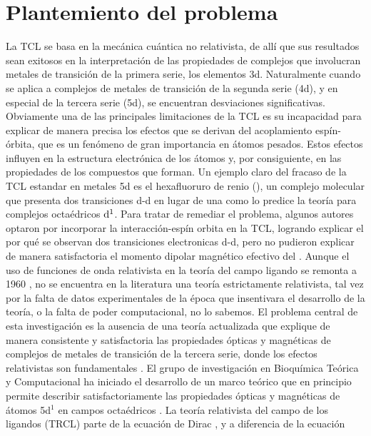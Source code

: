 \documentclass[12pt,a4paper]{article}
\begin{document}
\section{Plantemiento del problema}
La TCL se basa en la mecánica cuántica no relativista, de all\'i que sus resultados sean exitosos en la interpretación
de las propiedades de complejos que involucran metales de transición de la primera serie, los elementos 3d.
Naturalmente cuando se aplica a complejos de metales de transición de la segunda serie (4d), y en especial
de la tercera serie (5d), se encuentran desviaciones significativas.
Obviamente una de las principales limitaciones de la TCL es su incapacidad para explicar de manera precisa los efectos
que se derivan del acoplamiento espín-órbita, que es un fenómeno de gran importancia en átomos pesados.
Estos efectos influyen en la estructura electrónica de los átomos y, por consiguiente, en las propiedades de los
compuestos que forman.
Un ejemplo claro del fracaso de la TCL estandar en metales 5d es el hexafluoruro de renio (), un complejo molecular que presenta dos
transiciones d-d en lugar de una como lo predice la teor\'ia para complejos octa\'edricos ${\rm d}^1$.
Para tratar de remediar el problema, algunos autores optaron por incorporar la interacci\'on-esp\'in orbita en la TCL,
logrando explicar el por qu\'e se observan dos transiciones electronicas d-d, pero no pudieron explicar de manera satisfactoria
el momento dipolar magn\'etico efectivo del  \cite{Moffitt1959,Selig1962}. Aunque el uso de funciones de onda relativista en
la teor\'ia del campo ligando se remonta a 1960 \cite{Moffitt1959,Liehr1960,Wybourne1965,Basu1982},
no se encuentra en la literatura una teor\'ia estrictamente relativista, tal vez por la falta de datos experimentales de la \'epoca
que insentivara el desarrollo de la teor\'ia, o la falta de poder computacional, no lo sabemos.
El problema central de esta investigación es la ausencia de una teor\'ia actualizada que explique de manera
consistente y satisfactoria las propiedades ópticas y magnéticas de complejos de metales de transición de la
tercera serie, donde los efectos relativistas son fundamentales \cite{Neese1998}.
El grupo de investigaci\'on en Bioqu\'imica Te\'orica y Computacional ha iniciado el desarrollo de un marco te\'orico que en principio
permite describir satisfactoriamente las propiedades \'opticas y magn\'eticas de \'atomos 5d$^1$ en campos octa\'edricos \cite{jperez2024a}.
La teor\'ia relativista del campo de los ligandos (TRCL) parte de la ecuación de Dirac \cite{Dirac1928}, y a diferencia de la ecuaci\'on
\end{document}
